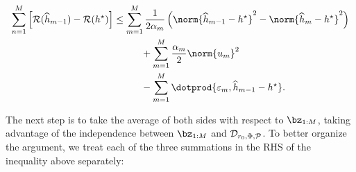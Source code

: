 \begin{align*}
    \sum_{ n=1 }^{ M } \left[
        \risk ( \hat{ h }_{ m-1 } ) - \risk ( \hstar )
    \right]
    &\leq \sum_{ m=1 }^{ M } \frac{ 1 }{ 2 \alpha_{ m } } \left(
        \norm{ \hat{ h }_{ m-1 } - \hstar }^2
        -
        \norm{ \hat{ h }_{ m } - \hstar }^2
    \right) \\
    &\hspace{1cm} + \sum_{ m=1 }^{ M } \frac{ \alpha_{ m } }{ 2 } \norm{ u_{ m } }^2 \\
    &\hspace{1cm} - \sum_{ m=1 }^{ M }
    \dotprod{ \varepsilon_{ m }, \hat{ h }_{ m-1 } - \hstar }
.\end{align*}

The next step is to take the average of both sides with respect to $ \bz_{ 1:M } $, taking advantage of the independence between $ \bz_{ 1:M } $ and $ \mathcal{D}_{ r_{ 0 }, \Phi, \mathcal{P} } $.
To better organize the argument, we treat each of the three summations in the RHS of the inequality above separately:

